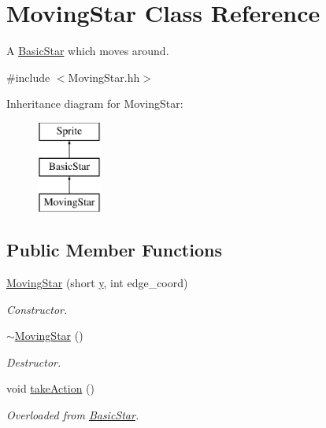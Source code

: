 \hypertarget{classMovingStar}{\section{Moving\-Star Class Reference}
\label{classMovingStar}
}


A \hyperlink{classBasicStar}{Basic\-Star} which moves around.  




{\ttfamily \#include $<$Moving\-Star.\-hh$>$}

Inheritance diagram for Moving\-Star\-:\begin{figure}[H]
\begin{center}
\leavevmode
\includegraphics[height=3.000000cm]{classMovingStar}
\end{center}
\end{figure}
\subsection*{Public Member Functions}
\begin{DoxyCompactItemize}
\item 
\hyperlink{classMovingStar_a29183a4bfc5627aae634ac3ae8354edb}{Moving\-Star} (short \hyperlink{classSprite_afca2c03aad9d2526427470688ae76439}{y}, int edge\-\_\-coord)
\begin{DoxyCompactList}\small\item\em Constructor. \end{DoxyCompactList}\item 
\hyperlink{classMovingStar_a69d4f41d9c8710887ac8f678bb2026aa}{$\sim$\-Moving\-Star} ()
\begin{DoxyCompactList}\small\item\em Destructor. \end{DoxyCompactList}\item 
void \hyperlink{classMovingStar_a273dfe02f9eab1148da09619e34480e9}{take\-Action} ()
\begin{DoxyCompactList}\small\item\em Overloaded from \hyperlink{classBasicStar}{Basic\-Star}. \end{DoxyCompactList}\end{DoxyCompactItemize}
